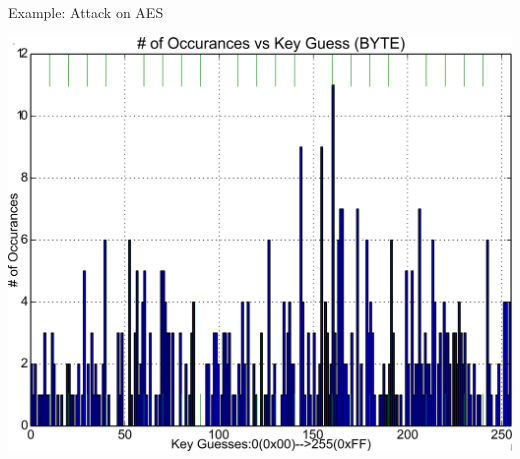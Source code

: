 \documentclass[final]{beamer}
\begin{document}
\begin{frame}[fragile]{}
\begin{columns}[t]
\begin{column}{.31\linewidth}
\begin{block}{Example: Attack on AES}
\begin{minipage}[t]{0.49\linewidth}
        \end{minipage}%
        \begin{minipage}[t]{0.49\linewidth}  
           \includegraphics[width=0.9\linewidth]{../figures/histogram}
        \end{minipage}
 
       \end{block}
%          
%          
   \end{column}
\end{columns}

\end{frame}
\end{document}
